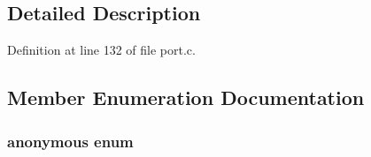 \subsection{Detailed Description}


Definition at line 132 of file port.\-c.



\subsection{Member Enumeration Documentation}
\hypertarget{struct_t_h_r_e_a_d___s_u_s_p_e_n_s_i_o_n_s_ae6e5dd8db50db603c38992bec6c3b140}{\subsubsection[{anonymous enum}]{\setlength{\rightskip}{0pt plus 5cm}anonymous enum}}\label{struct_t_h_r_e_a_d___s_u_s_p_e_n_s_i_o_n_s_ae6e5dd8db50db603c38992bec6c3b140}

